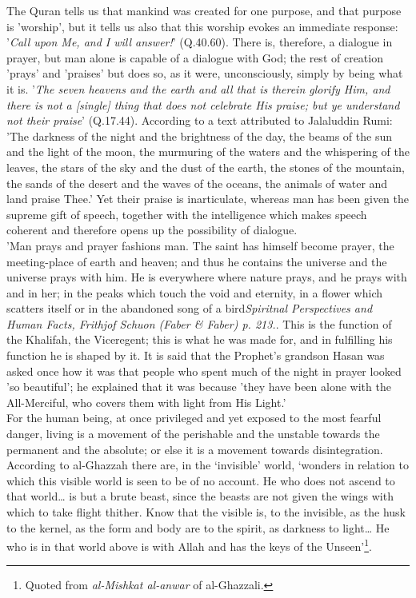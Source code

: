 \documentclass[10pt, twoside,openright]{book}
\begin{document}
The Quran tells us that mankind was created for one purpose, and that purpose is 'worship', but it 
tells us also that this worship evokes an immediate response: '\emph{Call upon Me, and I will 
answer!}' (Q.40.60). There is, therefore, a dialogue in prayer, but man alone is capable of a dialogue 
with God; the rest of creation 'prays' and 'praises' but does so, as it were, unconsciously, simply 
by being what it is. '\emph{The seven heavens and the earth and all that is therein glorify Him, and there 
is not a [single] thing that does not celebrate His praise; but ye understand not their 
praise}' (Q.17.44). According to a text attributed to Jalaluddin Rumi: 'The darkness of the night and 
the brightness of the day, the beams of the sun and the light of the moon, the murmuring of the 
waters and the whispering of the leaves, the stars of the sky and the dust of the earth, the stones 
of the mountain, the sands of the desert and the waves of the oceans, the animals of water and land 
praise Thee.' Yet their praise is inarticulate, whereas man has been given the supreme gift of 
speech, together with the intelligence which makes speech coherent and therefore opens up the 
possibility of dialogue. \\

'Man prays and prayer fashions man. The saint has himself become prayer, the meeting\hyp{}place of earth 
and heaven; and thus he contains the universe and the universe prays with him. He is everywhere where 
nature prays, and he prays with and in her; in the peaks which touch the void and eternity, in a 
flower which scatters itself or in the abandoned song of a bird\emph{\emph{Spiritnal Perspectives and Human Facts}, Frithjof Schuon (Faber \& Faber) p. 213.}. This is the function of the 
Khalifah, the Viceregent; this is what he was made for, and in fulfilling his function he is shaped 
by it. It is said that the Prophet's grandson Hasan was asked once how it was that people who spent 
much of the night in prayer looked 'so beautiful'; he explained that it was because 'they have been 
alone with the All\hyp{}Merciful, who covers them with light from His Light.' \\

For the human being, at once privileged and yet exposed to the most fearful danger, living is a 
movement of the perishable and the unstable towards the permanent and the absolute; or else it is a 
movement towards disintegration. According to al\hyp{}Ghazzah there are, in the `invisible' world, 
`wonders in relation to which this visible world is seen to be of no account. He who does not ascend 
to that world\ldots{} is but a brute beast, since the beasts are not given the wings with which to take 
flight thither. Know that the visible is, to the invisible, as the husk to the kernel, as the form 
and body are to the spirit, as darkness to light\ldots{} He who is in that world above is with Allah and 
has the keys of the Unseen'\footnote{Quoted from \emph{al\hyp{}Mishkat al\hyp{}anwar} of al\hyp{}Ghazzali.}.\\
\end{document}
